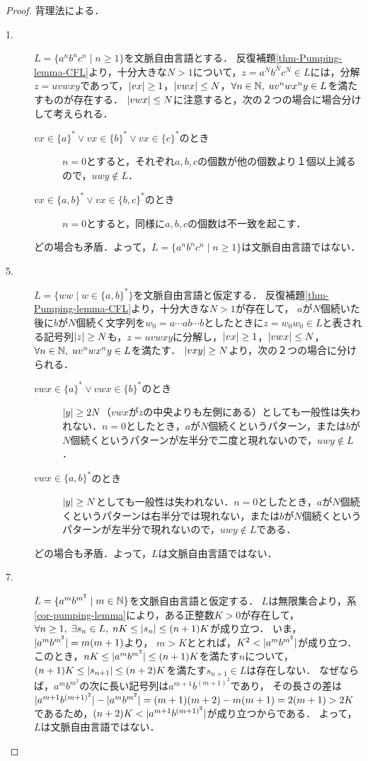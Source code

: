 \documentclass[uplatex, dvipdfmx]{jsreport}
\begin{document}
\begin{proof}
    背理法による．
    \begin{description}
        \item[1.] $L=\{a^nb^nc^n\mid n\ge 1\}$を文脈自由言語とする．
        反復補題\ref{thm-Pumping-lemma-CFL}より，十分大きな$N>1$について，$z=a^Nb^Nc^N\in L$には，分解$z=uvwxy$であって，$\lvert vx\rvert\ge 1$，$\lvert vwx\rvert\le N$，$\forall n\in\mathbb{N},\;uv^nwx^ny\in L$を満たすものが存在する．
        $\lvert vwx\rvert\le N$に注意すると，次の２つの場合に場合分けして考えられる．
        \begin{description}
            \item[$vx\in\{a\}^*\lor vx\in\{b\}^*\lor vx\in\{c\}^*$のとき] $n=0$とすると，それぞれ$a,b,c$の個数が他の個数より１個以上減るので，$uwy\notin L$．
            \item[$vx\in\{a,b\}^*\lor vx\in\{b,c\}^*$のとき] $n=0$とすると，同様に$a,b,c$の個数は不一致を起こす．
        \end{description}
        どの場合も矛盾．よって，$L=\{a^nb^nc^n\mid n\ge 1\}$は文脈自由言語ではない．
        \item[5.]
        $L=\{ww\mid w\in\{a,b\}^*\}$を文脈自由言語と仮定する．
        反復補題\ref{thm-Pumping-lemma-CFL}より，十分大きな$N>1$が存在して，
        $a$が$N$個続いた後に$b$が$N$個続く文字列を$w_0=a\cdots ab\cdots b$としたときに$z=w_0w_0\in L$と表される記号列$\lvert z\rvert\ge N$も，$z=uvwxy$に分解し，$\lvert vx\rvert\ge 1$，$\lvert vwx\rvert\le N$，$\forall n\in\mathbb{N},\;uv^nwx^ny\in L$を満たす．
        $\lvert vxy\rvert\ge N$より，次の２つの場合に分けられる．
        \begin{description}
            \item[$vwx\in\{a\}^*\lor vwx\in\{b\}^*$のとき] $\lvert y\rvert\ge 2N$（$vwx$が$z$の中央よりも左側にある）としても一般性は失われない．$n=0$としたとき，$a$が$N$個続くというパターン，または$b$が$N$個続くというパターンが左半分で二度と現れないので，$uwy\notin L$．
            \item[$vwx\in\{a,b\}^*$のとき] $\lvert y\rvert\ge N$としても一般性は失われない．$n=0$としたとき，$a$が$N$個続くというパターンは右半分では現れない，または$b$が$N$個続くというパターンが左半分で現れないので，$uwy\notin L$である．
        \end{description}
        どの場合も矛盾．よって，$L$は文脈自由言語ではない．
        \item[7.] $L=\{a^mb^{m^2}\mid m\in\mathbb{N}\}$を文脈自由言語と仮定する．
        $L$は無限集合より，系\ref{cor-pumping-lemma}により，ある正整数$K>0$が存在して，
        $\forall n\ge 1,\;\exists s_n\in L,\;nK\le\lvert s_n\rvert\le(n+1)K$が成り立つ．
        いま，$\lvert a^mb^{m^2}\rvert=m(m+1)$より，
        $m>K$ととれば，$K^2<\lvert a^mb^{m^2}\rvert$が成り立つ．このとき，$nK\le \lvert a^mb^{m^2}\rvert\le(n+1)K$を満たす$n$について，
        $(n+1)K\le\lvert s_{n+1}\rvert\le(n+2)K$を満たす$s_{n+1}\in L$は存在しない．
        なぜならば，$a^mb^{m^2}$の次に長い記号列は$a^{m+1}b^{(m+1)^2}$であり，
        その長さの差は$\lvert a^{m+1}b^{(m+1)^2}\rvert-\lvert a^mb^{m^2}\rvert=(m+1)(m+2)-m(m+1)=2(m+1)>2K$であるため，$(n+2)K<\lvert a^{m+1}b^{(m+1)^2}\rvert$が成り立つからである．
        よって，$L$は文脈自由言語ではない．
    \end{description}
\end{proof}
\end{document}
